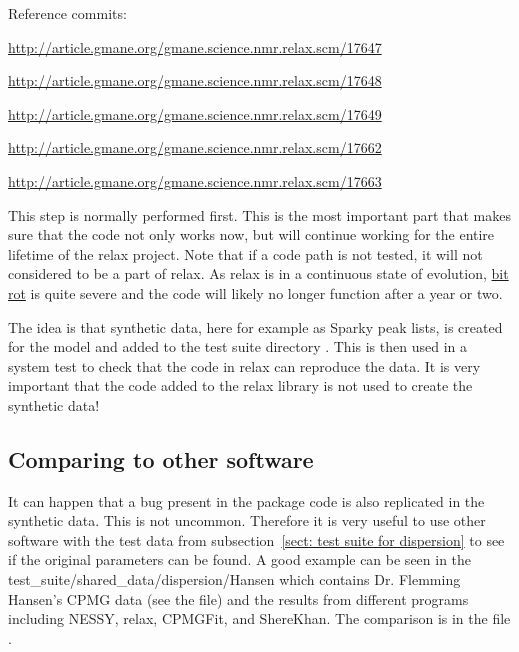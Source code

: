 Reference commits:

\href{http://article.gmane.org/gmane.science.nmr.relax.scm/17647}{http://article.gmane.org/gmane.science.nmr.relax.scm/17647}

\href{http://article.gmane.org/gmane.science.nmr.relax.scm/17648}{http://article.gmane.org/gmane.science.nmr.relax.scm/17648}

\href{http://article.gmane.org/gmane.science.nmr.relax.scm/17649}{http://article.gmane.org/gmane.science.nmr.relax.scm/17649}

\href{http://article.gmane.org/gmane.science.nmr.relax.scm/17662}{http://article.gmane.org/gmane.science.nmr.relax.scm/17662}

\href{http://article.gmane.org/gmane.science.nmr.relax.scm/17663}{http://article.gmane.org/gmane.science.nmr.relax.scm/17663}

This step is normally performed first.
This is the most important part that makes sure that the code not only works now, but will continue working for the entire lifetime of the relax project.
Note that if a code path is not tested, it will not considered to be a part of relax.
As relax is in a continuous state of evolution, \href{http://en.wikipedia.org/wiki/Bit\_rot}{bit rot} is quite severe and the code will likely no longer function after a year or two.

The idea is that synthetic data, here for example as Sparky peak lists, is created for the model and added to the test suite directory .  This is then used in a system test to check that the code in relax can reproduce the data.  It is very important that the code added to the relax library is not used to create the synthetic data!


\subsection{Comparing to other software}
\label{sect: dispersion software comparison}

It can happen that a bug present in the  package code is also replicated in the synthetic data.  This is not uncommon. Therefore it is very useful to use other software with the test data from subsection~\ref{sect: test suite for dispersion} to see if the original parameters can be found.  A good example can be seen in the test\_suite/shared\_data/dispersion/Hansen which contains Dr. Flemming Hansen's CPMG data (see the  file) and the results from different programs including NESSY, relax, CPMGFit, and ShereKhan.  The comparison is in the file .

